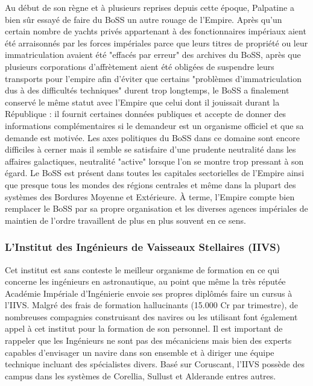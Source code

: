 \documentclass[twoside]{article}
\begin{document}
Au début de son règne et à plusieurs reprises depuis cette époque, Palpatine a bien sûr essayé de faire du BoSS un autre rouage de l'Empire. Après qu'un certain nombre de yachts privés appartenant à des fonctionnaires impériaux aient été arraisonnés par les forces impériales parce que leurs titres de propriété ou leur immatriculation avaient été "effacés par erreur" des archives du BoSS, après que plusieurs corporations d'affrètement aient été obligées de suspendre leurs transports pour l'empire afin d'éviter que certains "problèmes d'immatriculation dus à des difficultés techniques" durent trop longtemps, le BoSS a finalement conservé le même statut avec l'Empire que celui dont il jouissait durant la République : il fournit certaines données publiques et accepte de donner des informations complémentaires si le demandeur est un organisme officiel et que sa demande est motivée. Les axes politiques du BoSS dans ce domaine sont encore difficiles à cerner mais il semble se satisfaire d'une prudente neutralité dans les affaires galactiques, neutralité "active" lorsque l'on se montre trop pressant à son égard. Le BoSS est présent dans toutes les capitales sectorielles de l'Empire ainsi que presque tous les mondes des régions centrales et même dans la plupart des systèmes des Bordures Moyenne et Extérieure. À terme, l'Empire compte bien remplacer le BoSS par sa propre organisation et les diverses agences impériales de maintien de l'ordre travaillent de plus en plus souvent en ce sens.

\subsubsection{L'Institut des Ingénieurs de Vaisseaux Stellaires (IIVS)}
Cet institut est sans conteste le meilleur organisme de formation en ce qui concerne les ingénieurs en astronautique, au point que même la très réputée Académie Impériale d'Ingénierie envoie ses propres diplômés faire un cursus à l'IIVS. Malgré des frais de formation hallucinants (15.000 Cr par trimestre), de nombreuses compagnies construisant des navires ou les utilisant font également appel à cet institut pour la formation de son personnel. Il est important de rappeler que les Ingénieurs ne sont pas des mécaniciens mais bien des experts capables d'envisager un navire dans son ensemble et à diriger une équipe technique incluant des spécialistes divers. Basé sur Coruscant, l'IIVS possède des campus dans les systèmes de Corellia, Sullust et Alderande entres autres.\\
\end{document}

